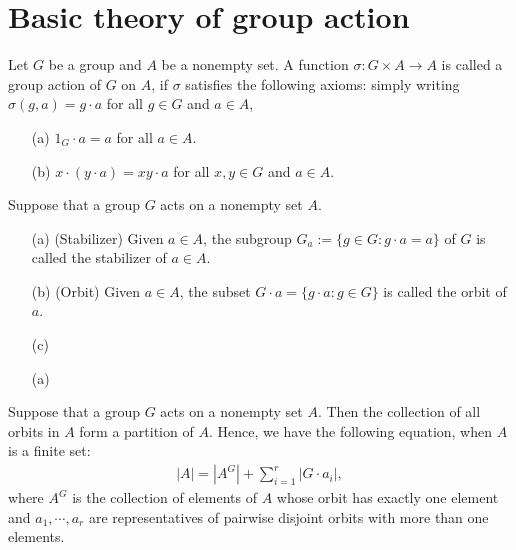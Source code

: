 \section{Basic theory of group action}

\begin{defi}
    Let $G$ be a group and $A$ be a nonempty set.
    A function $\sigma: G\times A\rightarrow A$ is called a group action of $G$ on $A$, if $\sigma$ satisfies the following axioms: simply writing $\sigma(g, a)=g\cdot a$ for all $g\in G$ and $a\in A$,
    \begin{enumerate}
        \item[(a)]
        {
            $1_G\cdot a=a$ for all $a\in A$.
        }
        \item[(b)]
        {
            $x\cdot(y\cdot a)=xy\cdot a$ for all $x, y\in G$ and $a\in A$.
        }
    \end{enumerate}
\end{defi}

\begin{defi}
    Suppose that a group $G$ acts on a nonempty set $A$.
    \begin{enumerate}
        \item[(a)]
        {
            (Stabilizer)
            Given $a\in A$, the \color{brown}subgroup $G_a:=\{g\in G: g\cdot a=a\}$ of $G$ \color{black}is called the stabilizer of $a\in A$.
        }
        \item[(b)]
        {
            (Orbit)
            Given $a\in A$, the subset $G\cdot a=\{g\cdot a: g\in G\}$ is called the orbit of $a$.
        }
        \item[(c)]
        {

        }
        \item[(a)]
        {

        }
    \end{enumerate}
\end{defi}

\begin{obs}
    Suppose that a group $G$ acts on a nonempty set $A$.
    Then the collection of all orbits in $A$ form a partition of $A$.
    Hence, we have the following equation, when $A$ is a finite set:
    \begin{align*}
        |A|=|A^G|+\sum_{i=1}^r|G\cdot a_i|,
    \end{align*}
    where $A^G$ is the collection of elements of $A$ whose orbit has exactly one element and $a_1, \cdots, a_r$ are representatives of pairwise disjoint orbits with more than one elements.
\end{obs}